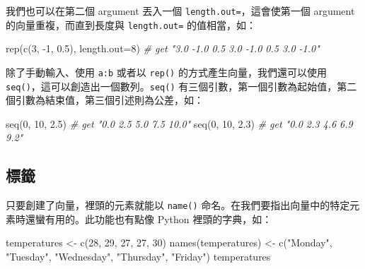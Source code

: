 \documentclass[
]{book}
\newenvironment{Shaded}{\begin{snugshade}}{\end{snugshade}}
\newcommand{\AttributeTok}[1]{\textcolor[rgb]{0.77,0.63,0.00}{#1}}
\newcommand{\CommentTok}[1]{\textcolor[rgb]{0.56,0.35,0.01}{\textit{#1}}}
\newcommand{\DecValTok}[1]{\textcolor[rgb]{0.00,0.00,0.81}{#1}}
\newcommand{\FloatTok}[1]{\textcolor[rgb]{0.00,0.00,0.81}{#1}}
\newcommand{\FunctionTok}[1]{\textcolor[rgb]{0.00,0.00,0.00}{#1}}
\newcommand{\NormalTok}[1]{#1}
\newcommand{\OtherTok}[1]{\textcolor[rgb]{0.56,0.35,0.01}{#1}}
\newcommand{\SpecialCharTok}[1]{\textcolor[rgb]{0.00,0.00,0.00}{#1}}
\newcommand{\StringTok}[1]{\textcolor[rgb]{0.31,0.60,0.02}{#1}}
\theoremstyle{definition}
\theoremstyle{remark}
\begin{document}
我們也可以在第二個 argument 丟入一個 \texttt{length.out=}，這會使第一個 argument 的向量重複，而直到長度與 \texttt{length.out=} 的值相當，如：

\begin{Shaded}
\begin{Highlighting}[]
\FunctionTok{rep}\NormalTok{(}\FunctionTok{c}\NormalTok{(}\DecValTok{3}\NormalTok{, }\SpecialCharTok{{-}}\DecValTok{1}\NormalTok{, }\FloatTok{0.5}\NormalTok{), }\AttributeTok{length.out=}\DecValTok{8}\NormalTok{)  }\CommentTok{\# get "3.0 {-}1.0  0.5  3.0 {-}1.0  0.5  3.0 {-}1.0"}
\end{Highlighting}
\end{Shaded}

除了手動輸入、使用 \texttt{a:b} 或者以 \texttt{rep()} 的方式產生向量，我們還可以使用 \texttt{seq()}，這可以創造出一個數列。\texttt{seq()} 有三個引數，第一個引數為起始值，第二個引數為結束值，第三個引述則為公差，如：

\begin{Shaded}
\begin{Highlighting}[]
\FunctionTok{seq}\NormalTok{(}\DecValTok{0}\NormalTok{, }\DecValTok{10}\NormalTok{, }\FloatTok{2.5}\NormalTok{)  }\CommentTok{\# get "0.0  2.5  5.0  7.5 10.0"}
\FunctionTok{seq}\NormalTok{(}\DecValTok{0}\NormalTok{, }\DecValTok{10}\NormalTok{, }\FloatTok{2.3}\NormalTok{)  }\CommentTok{\# get "0.0 2.3 4.6 6.9 9.2"}
\end{Highlighting}
\end{Shaded}

\hypertarget{ux6a19ux7c64}{%
\subsection{標籤}\label{ux6a19ux7c64}}

只要創建了向量，裡頭的元素就能以 \texttt{name()} 命名。在我們要指出向量中的特定元素時還蠻有用的。此功能也有點像 Python 裡頭的字典，如：

\begin{Shaded}
\begin{Highlighting}[]
\NormalTok{temperatures }\OtherTok{\textless{}{-}} \FunctionTok{c}\NormalTok{(}\DecValTok{28}\NormalTok{, }\DecValTok{29}\NormalTok{, }\DecValTok{27}\NormalTok{, }\DecValTok{27}\NormalTok{, }\DecValTok{30}\NormalTok{)}
\FunctionTok{names}\NormalTok{(temperatures) }\OtherTok{\textless{}{-}} \FunctionTok{c}\NormalTok{(}\StringTok{"Monday"}\NormalTok{, }\StringTok{"Tuesday"}\NormalTok{, }\StringTok{"Wednesday"}\NormalTok{,}
\StringTok{"Thursday"}\NormalTok{, }\StringTok{"Friday"}\NormalTok{)}
\NormalTok{temperatures}
\end{Highlighting}
\end{Shaded}
\end{document}
